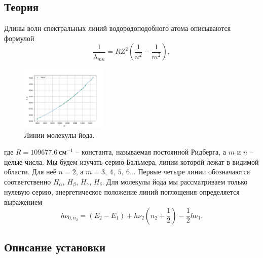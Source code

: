 \documentclass[a4paper, 12pt]{article}%
\begin{document}
\subsection{Теория}

Длины волн спектральных линий водородоподобного атома описываются формулой
\begin{equation}
\dfrac{1}{\lambda_{mn}} = RZ^2 \left( \dfrac{1}{n^2} - \dfrac{1}{m^2} \right),
\end{equation}
\begin{figure}
\includegraphics[width = 0.37\textwidth]{1.png}
\centering
\caption{Линии молекулы йода.}
\end{figure}
где $R = 109677.6~\text{см}^{-1}$ -- константа, называемая постоянной Ридберга, а $m$ и $n$ -- целые числа. Мы будем изучать серию Бальмера, линии которой лежат в видимой области. Для неё $n = 2$, а $m = 3,~4,~5,~6\dots$ Первые четыре линии обозначаются соответственно $H_\alpha$, $H_\beta$, $H_\gamma$, $H_\delta$.
Для молекулы йода мы рассматриваем только нулевую серию, энергетическое положение линий поглощения определяется выражением
\begin{equation}
h\nu_{0, n_2} = (E_2 - E_1) + h\nu_2 \left( n_2 + \dfrac{1}{2} \right) - \dfrac{1}{2} h \nu_1.
\end{equation}

\subsection{Описание установки}
\end{document}
